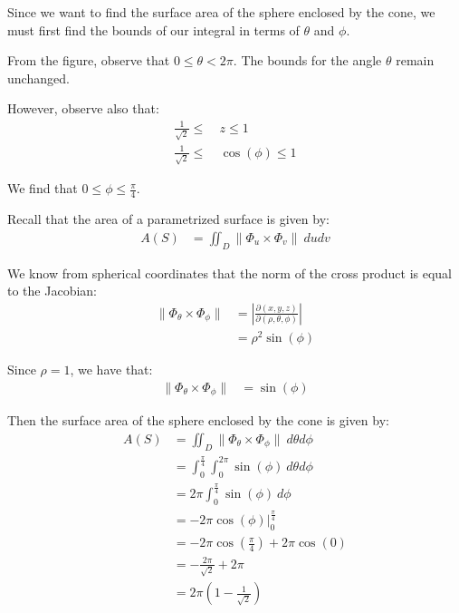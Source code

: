 \begin{solution}
    Since we want to find the surface area of the sphere enclosed by the cone, we must first find the bounds of our integral in terms of \(\theta\) and \(\phi\).
    
    From the figure, observe that \(0 \leq \theta < 2\pi\). The bounds for the angle \(\theta\) remain unchanged.
    
    However, observe also that:
    \begin{align*}
        \frac{1}{\sqrt{2}} \leq & \ z \leq 1 \\
        \frac{1}{\sqrt{2}} \leq & \ \cos(\phi) \leq 1
    \end{align*}
    
    We find that \(0 \leq \phi \leq \frac{\pi}{4}\).
    
    Recall that the area of a parametrized surface is given by:
    \begin{align}
        A(S) &= \iint_D \|\Phi_u \times \Phi_v \| \ dudv
    \end{align}
    
    We know from spherical coordinates that the norm of the cross product is equal to the Jacobian:
    \begin{align}
        \|\Phi_\theta \times \Phi_\phi \| &= \left|\frac{\partial(x, y, z)}{\partial(\rho, \theta, \phi)}\right| \\
        &= \rho^2\sin(\phi)
    \end{align}
    
    Since \(\rho = 1\), we have that:
    \begin{align*}
        \|\Phi_\theta \times \Phi_\phi \| &= \sin(\phi)
    \end{align*}
    
    Then the surface area of the sphere enclosed by the cone is given by:
    \begin{align*}
        A(S) &= \iint_D \|\Phi_\theta \times \Phi_\phi \| \ d\theta d\phi \\
        &= \int_0^{\frac{\pi}{4}} \int_0^{2\pi} \sin(\phi) \ d\theta d\phi \\
        &= 2\pi \int_0^{\frac{\pi}{4}} \sin(\phi) \ d\phi \\
        &= -2\pi \cos(\phi) \Big|_0^{\frac{\pi}{4}} \\
        &= -2\pi \cos\left(\frac{\pi}{4}\right) + 2\pi \cos(0)  \\
        &= -\frac{2\pi}{\sqrt{2}} + 2\pi \\
        &= 2\pi\left(1 -\frac{1}{\sqrt{2}}\right)
    \end{align*}
\end{solution}